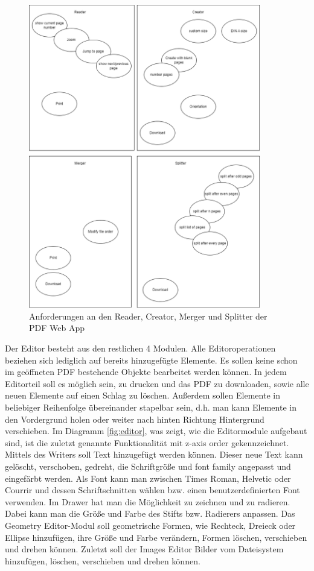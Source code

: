 \begin{figure}[!htbp]
	\centering
	\includegraphics[width=0.9\textwidth]{"images/app-funktionen-anforderungen.png"}
	\caption{Anforderungen an den Reader, Creator, Merger und Splitter der PDF Web App}
	\label{fig:modules4}
\end{figure}

Der Editor besteht aus den restlichen 4 Modulen. Alle Editoroperationen beziehen sich lediglich auf bereits hinzugefügte Elemente. Es sollen keine schon im geöffneten PDF bestehende Objekte bearbeitet werden können. In jedem Editorteil soll es möglich sein, zu drucken und das PDF zu downloaden, sowie alle neuen Elemente auf einen Schlag zu löschen. Außerdem sollen Elemente in beliebiger Reihenfolge übereinander stapelbar sein, d.h. man kann Elemente in den Vordergrund holen oder weiter nach hinten Richtung Hintergrund verschieben. Im Diagramm \ref{fig:editor}, was zeigt, wie die Editormodule aufgebaut sind, ist die zuletzt genannte Funktionalität mit z-axis order gekennzeichnet. Mittels des Writers soll Text hinzugefügt werden können. Dieser neue Text kann gelöscht, verschoben, gedreht, die Schriftgröße und font family angepasst und eingefärbt werden. Als Font kann man zwischen Times Roman, Helvetic oder Courrir und dessen Schriftschnitten wählen bzw. einen benutzerdefinierten Font verwenden. Im Drawer hat man die Möglichkeit zu zeichnen und zu radieren. Dabei kann man die Größe und Farbe des Stifts bzw. Radierers anpassen. Das Geometry Editor-Modul soll geometrische Formen, wie Rechteck, Dreieck oder Ellipse hinzufügen, ihre Größe und Farbe verändern, Formen löschen, verschieben und drehen können. Zuletzt soll der Images Editor Bilder vom Dateisystem hinzufügen, löschen, verschieben und drehen können.


